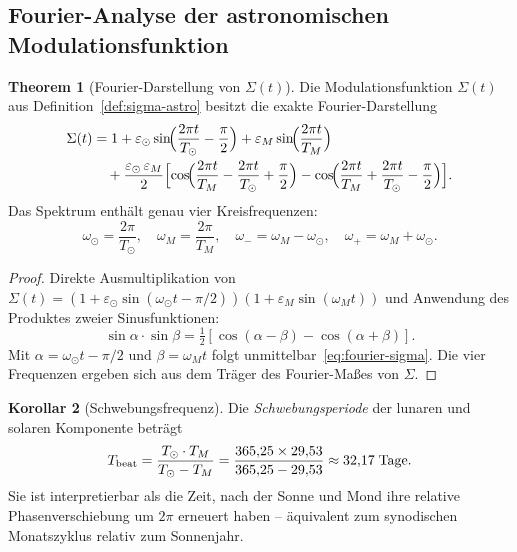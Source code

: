 ﻿\documentclass[12pt, a4paper]{article}
\theoremstyle{definition}
\newtheorem{theorem}{Theorem}[section]
\newtheorem{korollar}[theorem]{Korollar}
\begin{document}
\subsection{Fourier-Analyse der astronomischen Modulationsfunktion}

\begin{theorem}[Fourier-Darstellung von $\Sigma(t)$]\label{thm:fourier-sigma}
Die Modulationsfunktion $\Sigma(t)$ aus Definition~\ref{def:sigma-astro} besitzt
die exakte Fourier-Darstellung
\begin{equation}\label{eq:fourier-sigma}
\begin{aligned}
  \Sigma(t) &= 1
    + \varepsilon_{\odot}\sin\!\Bigl(\frac{2\pi t}{T_{\odot}} - \frac{\pi}{2}\Bigr)
    + \varepsilon_M \sin\!\Bigl(\frac{2\pi t}{T_M}\Bigr) \\
    &\quad + \frac{\varepsilon_{\odot}\,\varepsilon_M}{2}
      \Bigl[
        \cos\!\Bigl(\frac{2\pi t}{T_M} - \frac{2\pi t}{T_{\odot}} + \frac{\pi}{2}\Bigr)
        - \cos\!\Bigl(\frac{2\pi t}{T_M} + \frac{2\pi t}{T_{\odot}} - \frac{\pi}{2}\Bigr)
      \Bigr].
\end{aligned}
\end{equation}
Das Spektrum enthält genau vier Kreisfrequenzen:
\[
  \omega_{\odot} = \frac{2\pi}{T_{\odot}},\quad
  \omega_M = \frac{2\pi}{T_M},\quad
  \omega_- = \omega_M - \omega_{\odot},\quad
  \omega_+ = \omega_M + \omega_{\odot}.
\]
\end{theorem}

\begin{proof}
Direkte Ausmultiplikation von
$\Sigma(t) = (1 + \varepsilon_{\odot}\sin(\omega_{\odot}t - \pi/2))(1 + \varepsilon_M\sin(\omega_M t))$
und Anwendung des Produktes zweier Sinusfunktionen:
\[
  \sin\alpha\cdot\sin\beta = \tfrac{1}{2}[\cos(\alpha-\beta) - \cos(\alpha+\beta)].
\]
Mit $\alpha = \omega_{\odot}t - \pi/2$ und $\beta = \omega_M t$ folgt
unmittelbar~\eqref{eq:fourier-sigma}. Die vier Frequenzen ergeben sich aus dem
Träger des Fourier-Maßes von $\Sigma$. \hfill
\end{proof}

\begin{korollar}[Schwebungsfrequenz]\label{cor:schwebung}
Die \emph{Schwebungsperiode} der lunaren und solaren Komponente beträgt
\begin{equation}\label{eq:schwebung}
  T_{\rm beat} = \frac{T_{\odot}\cdot T_M}{T_{\odot} - T_M}
  = \frac{365{,}25 \times 29{,}53}{365{,}25 - 29{,}53}
  \approx 32{,}17\;\text{Tage}.
\end{equation}
Sie ist interpretierbar als die Zeit, nach der Sonne und Mond ihre relative
Phasenverschiebung um $2\pi$ erneuert haben -- äquivalent zum synodischen
Monatszyklus relativ zum Sonnenjahr.
\end{korollar}
\end{document}

